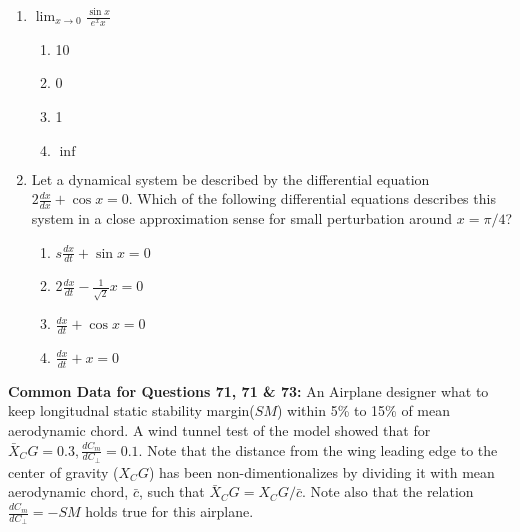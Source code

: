 \documentclass[journal]{IEEEtran}
\begin{document}
\begin{enumerate}
    \item $\lim_{x\to 0}\frac{\sin x}{e^x x}$
        \begin{enumerate}
            \item 10
            \item 0
            \item 1
            \item $\inf$
        \end{enumerate}
    \item Let a dynamical system be described by the differential equation $\displaystyle2\frac{dx}{dx} + \cos x = 0$. Which of the following differential equations describes this system in a close approximation sense for small perturbation around $x = \pi / 4$?
        \begin{enumerate}
            \item $s\frac{dx}{dt}+\sin x = 0$
            \item $2\frac{dx}{dt} - \frac{1}{\sqrt{2}}x=0$
            \item $\frac{dx}{dt}+ \cos x = 0$
            \item $\frac{dx}{dt} + x = 0$
        \end{enumerate}

\end{enumerate}
        \textbf{Common Data for Questions 71, 71 \& 73:} An Airplane designer what to keep longitudnal static stability margin($SM$)  within 5\% to 15\% of mean aerodynamic chord. A wind tunnel test of the model showed that for $\displaystyle\bar{X}_CG = 0.3, \frac{dC_m}{dC_\perp} = 0.1$. Note that the distance from the wing leading edge to the center of gravity ($X_CG$) has been non-dimentionalizes by dividing it with mean aerodynamic chord, $\bar{c}$, such that $\bar{X}_CG = X_CG/\bar{c}$. Note also that the relation $\displaystyle\frac{dC_m}{dC_\perp} = -SM$ holds true for this airplane.
\end{document}
